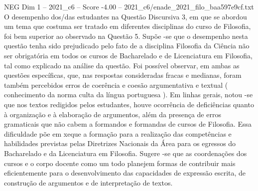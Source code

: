 \begin{textsample}{NEG Dim 1 – 2021\_c6 – Score -4.00 – 2021\_c6/enade\_2021\_filo\_baa597e9cf.txt}
O desempenho dos/das estudantes na Questão Discursiva 3, em que se abordou um tema que costuma ser tratado em diferentes disciplinas do curso de Filosofia, foi bem superior ao observado na Questão 5.
Supõe -se que o desempenho nesta questão tenha sido prejudicado pelo fato de a disciplina Filosofia da Ciência não ser obrigatória em todos os cursos de Bacharelado e de Licenciatura em Filosofia, tal como explicado na análise da questão.
Foi possível observar, em ambas as questões específicas, que, nas respostas consideradas fracas e medianas, foram também percebidos erros de coerência e coesão argumentativa e textual ( conhecimento da norma culta da língua portuguesa ).
Em linhas gerais, notou -se que nos textos redigidos pelos estudantes, houve ocorrência de deficiências quanto à organização e à elaboração de argumentos, além da presença de erros gramaticais que não cabem a formandos e formandas de cursos de Filosofia.
Essa dificuldade põe em xeque a formação para a realização das competências e habilidades previstas pelas Diretrizes Nacionais da Área para os egressos do Bacharelado e da Licenciatura em Filosofia.
Sugere -se que as coordenações dos cursos e o corpo docente como um todo planejem formas de contribuir mais eficientemente para o desenvolvimento das capacidades de expressão escrita, de construção de argumentos e de interpretação de textos.

\end{textsample}
